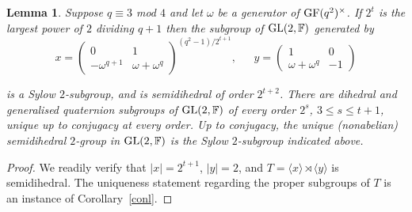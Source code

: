 \documentclass[12pt]{amsart}
\newtheorem{lemma}[theorem]{Lemma}
\theoremstyle{definition}
\theoremstyle{remark}
\begin{document}
\begin{lemma}
\label{2gps}
 Suppose $q\equiv 3$ mod $4$ and let $\omega$ be 
 a generator of ${\rm GF}(q^2)^{\times}$. 
 If $2^t$ is the largest power of $2$ dividing 
 $q+1$ then the subgroup of  
 ${\rm GL}(2,\mathbb{F})$  generated by 
$$
x= \left(
\begin{array}{cc}
 0 & 1 \\
 -\omega^{q+1} & \omega + \omega^q 
\end{array} \right)^{(q^2-1)/2^{t+1}}
 , \ \ \ \ \ \ \ 
y= \left(
\begin{array}{cc}
 1 & 0 \\
 \omega + \omega^q & -1 
\end{array}\right) 
$$
 
\noindent is a Sylow $2$-subgroup, and is semidihedral of
 order $2^{t+2}$.
 There are dihedral and generalised quaternion subgroups
 of ${\rm GL}(2,\mathbb{F})$ of every order $2^s$, 
 $3 \leq s \leq t+1$, unique up to conjugacy 
 at every order. Up to conjugacy, the unique 
 {\rm (}nonabelian{\rm )} semidihedral $2$-group in  
 ${\rm GL}(2,\mathbb{F})$ is the Sylow $2$-subgroup 
 indicated above.
\end{lemma}
\begin{proof}
 We readily verify that $|x| = 2^{t+1}$, $|y|=2$, and 
 $T = \langle x \rangle \rtimes \langle  y \rangle$
 is semidihedral. 
 The uniqueness statement regarding the proper 
 subgroups of $T$ is an instance of 
 Corollary~\ref{conl}.  
\end{proof}
\end{document}
